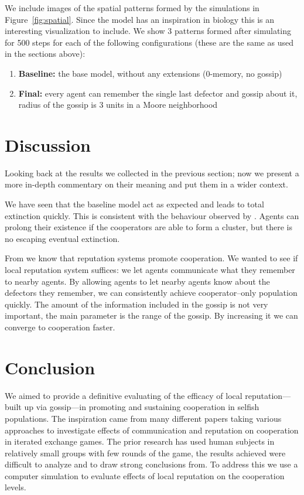 \documentclass[runningheads]{llncs}
\begin{document}
We include images of the spatial patterns formed by the simulations in Figure~\ref{fig:spatial}.
Since the model has an inspiration in biology this is an interesting visualization to include.
We show 3 patterns formed after simulating for 500 steps for each of the following configurations
(these are the same as used in the sections above):
\begin{enumerate}
  \setlength\itemsep{0em}
  \setlength\parskip{0cm}
  \item
    \textbf{Baseline:} the base model, without any extensions (0-memory, no gossip)
  \item
    \textbf{Final:} every agent can remember the single last defector and gossip about it,
    radius of the gossip is 3 units in a Moore neighborhood
\end{enumerate}
%
%
%
\section{Discussion}
Looking back at the results we collected in the previous section;
now we present a more in-depth commentary on their meaning and
put them in a wider context.

We have seen that the baseline model act as expected and leads to total extinction quickly.
This is consistent with the behaviour observed by \cite{smaldino}.
Agents can prolong their existence if the cooperators are able to form a cluster,
but there is no escaping eventual extinction.

From \cite{simple-reputation, public-private-monitoring} we know that reputation systems promote cooperation.
We wanted to see if local reputation system suffices: we let agents communicate what they remember to nearby agents.
By allowing agents to let nearby agents know about the defectors they remember, we can consistently achieve cooperator--only population quickly.
The amount of the information included in the gossip is not very important, the main parameter is the range of the gossip.
By increasing it we can converge to cooperation faster.
%
%
%
\section{Conclusion}
We aimed to provide a definitive evaluating of the efficacy of local reputation---built up via gossip---in promoting and sustaining cooperation in selfish populations.
The inspiration came from many different papers taking various approaches to investigate effects of communication and reputation on cooperation in iterated exchange games.
The prior research has used human subjects in relatively small groups with few rounds of the game, the results achieved were difficult to analyze and to draw strong conclusions from.
To address this we use a computer simulation to evaluate effects of local reputation on the cooperation levels.
\end{document}
